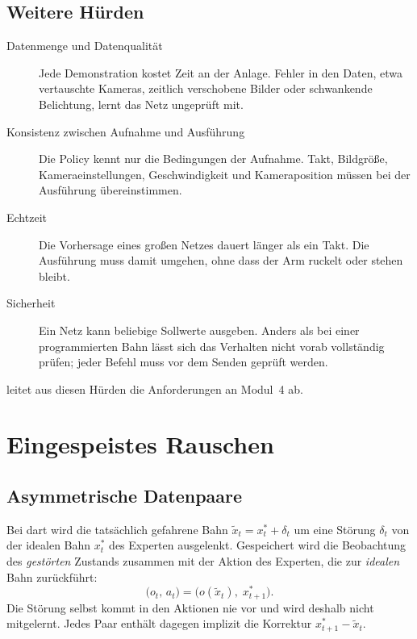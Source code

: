 \subsection{Weitere Hürden}
\label{sec:weitere-huerden}

\begin{description}
  \item[Datenmenge und Datenqualität] Jede Demonstration kostet Zeit an der Anlage. Fehler in
    den Daten, etwa vertauschte Kameras, zeitlich verschobene Bilder oder schwankende
    Belichtung, lernt das Netz ungeprüft mit.
  \item[Konsistenz zwischen Aufnahme und Ausführung] Die Policy kennt nur die Bedingungen der
    Aufnahme. Takt, Bildgröße, Kameraeinstellungen, Geschwindigkeit und Kameraposition müssen
    bei der Ausführung übereinstimmen.
  \item[Echtzeit] Die Vorhersage eines großen Netzes dauert länger als ein Takt. Die
    Ausführung muss damit umgehen, ohne dass der Arm ruckelt oder stehen bleibt.
  \item[Sicherheit] Ein Netz kann beliebige Sollwerte ausgeben. Anders als bei einer
    programmierten Bahn lässt sich das Verhalten nicht vorab vollständig prüfen; jeder Befehl
    muss vor dem Senden geprüft werden.
\end{description}
 leitet aus diesen Hürden die Anforderungen an Modul~4 ab.

\section{Eingespeistes Rauschen}
\label{sec:rauschen-mathe}

\subsection{Asymmetrische Datenpaare}

Bei \ac{dart} wird die tatsächlich gefahrene Bahn $\tilde x_t = x_t^{*} + \delta_t$ um eine
Störung $\delta_t$ von der idealen Bahn $x_t^{*}$ des Experten ausgelenkt. Gespeichert wird
die Beobachtung des \emph{gestörten} Zustands zusammen mit der Aktion des Experten, die zur
\emph{idealen} Bahn zurückführt:
\begin{equation}
  \bigl(o_t,\, a_t\bigr) = \bigl(o(\tilde x_t),\; x_{t+1}^{*}\bigr) .
  \label{eq:asymm}
\end{equation}
Die Störung selbst kommt in den Aktionen nie vor und wird deshalb nicht mitgelernt. Jedes
Paar enthält dagegen implizit die Korrektur $x_{t+1}^{*} - \tilde x_t$.

